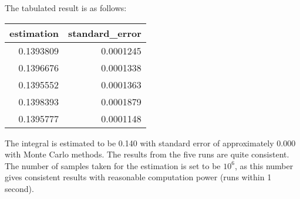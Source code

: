 The tabulated result is as follows:\\
\center
\begin{knitrout}
\color{fgcolor}
\begin{tabular}{r|r}
\hline
estimation & standard\_error\\
\hline
0.1393809 & 0.0001245\\
\hline
0.1396676 & 0.0001338\\
\hline
0.1395552 & 0.0001363\\
\hline
0.1398393 & 0.0001879\\
\hline
0.1395777 & 0.0001148\\
\hline
\end{tabular}


\end{knitrout}
The integral is estimated to be 0.140 with standard error of approximately 0.000 with Monte Carlo methods. The results from the five runs are quite consistent. The number of samples taken for the estimation is set to be $\ensuremath{10^{6}}$, as this number gives consistent results with reasonable computation power (runs within 1 second). 
